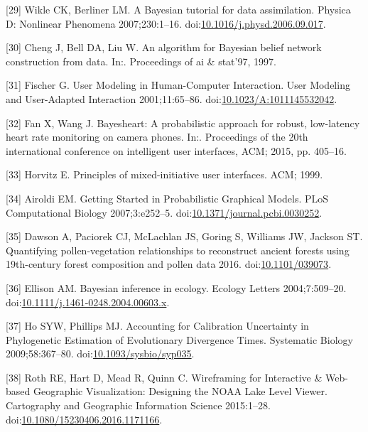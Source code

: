 \documentclass[]{article}
\begin{document}
\hypertarget{ref-Wikle:2007dy}{}
{[}29{]} Wikle CK, Berliner LM. A Bayesian tutorial for data
assimilation. Physica D: Nonlinear Phenomena 2007;230:1--16.
doi:\href{https://doi.org/10.1016/j.physd.2006.09.017}{10.1016/j.physd.2006.09.017}.

\hypertarget{ref-Cheng:1997wg}{}
{[}30{]} Cheng J, Bell DA, Liu W. An algorithm for Bayesian belief
network construction from data. In:. Proceedings of ai \& stat'97, 1997.

\hypertarget{ref-Fischer:2001jl}{}
{[}31{]} Fischer G. User Modeling in Human-Computer Interaction. User
Modeling and User-Adapted Interaction 2001;11:65--86.
doi:\href{https://doi.org/10.1023/A:1011145532042}{10.1023/A:1011145532042}.

\hypertarget{ref-Fan:2015du}{}
{[}32{]} Fan X, Wang J. Bayesheart: A probabilistic approach for robust,
low-latency heart rate monitoring on camera phones. In:. Proceedings of
the 20th international conference on intelligent user interfaces, ACM;
2015, pp. 405--16.

\hypertarget{ref-Anonymous:XBUc-RmI}{}
{[}33{]} Horvitz E. Principles of mixed-initiative user interfaces. ACM;
1999.

\hypertarget{ref-Airoldi:2007br}{}
{[}34{]} Airoldi EM. Getting Started in Probabilistic Graphical Models.
PLoS Computational Biology 2007;3:e252--5.
doi:\href{https://doi.org/10.1371/journal.pcbi.0030252}{10.1371/journal.pcbi.0030252}.

\hypertarget{ref-Dawson:2016wa}{}
{[}35{]} Dawson A, Paciorek CJ, McLachlan JS, Goring S, Williams JW,
Jackson ST. Quantifying pollen-vegetation relationships to reconstruct
ancient forests using 19th-century forest composition and pollen data
2016. doi:\href{https://doi.org/10.1101/039073}{10.1101/039073}.

\hypertarget{ref-Ellison:2004fj}{}
{[}36{]} Ellison AM. Bayesian inference in ecology. Ecology Letters
2004;7:509--20.
doi:\href{https://doi.org/10.1111/j.1461-0248.2004.00603.x}{10.1111/j.1461-0248.2004.00603.x}.

\hypertarget{ref-Ho:2009gn}{}
{[}37{]} Ho SYW, Phillips MJ. Accounting for Calibration Uncertainty in
Phylogenetic Estimation of Evolutionary Divergence Times. Systematic
Biology 2009;58:367--80.
doi:\href{https://doi.org/10.1093/sysbio/syp035}{10.1093/sysbio/syp035}.

\hypertarget{ref-Roth:2015ts}{}
{[}38{]} Roth RE, Hart D, Mead R, Quinn C. Wireframing for Interactive
\& Web-based Geographic Visualization: Designing the NOAA Lake Level
Viewer. Cartography and Geographic Information Science 2015:1--28.
doi:\href{https://doi.org/10.1080/15230406.2016.1171166}{10.1080/15230406.2016.1171166}.
\end{document}
